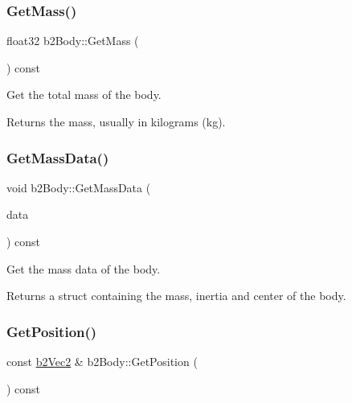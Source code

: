 \subsubsection{\texorpdfstring{Get\+Mass()}{GetMass()}}
{\footnotesize\ttfamily float32 b2\+Body\+::\+Get\+Mass (\begin{DoxyParamCaption}{ }\end{DoxyParamCaption}) const\hspace{0.3cm}{\ttfamily [inline]}}

Get the total mass of the body. \begin{DoxyReturn}{Returns}
the mass, usually in kilograms (kg). 
\end{DoxyReturn}
\mbox{\label{classb2_body_a5100927dbd39dd0addea79d5f323f3f1}} 
\subsubsection{\texorpdfstring{Get\+Mass\+Data()}{GetMassData()}}
{\footnotesize\ttfamily void b2\+Body\+::\+Get\+Mass\+Data (\begin{DoxyParamCaption}\item[{\hyperlink{structb2_mass_data}{b2\+Mass\+Data} $\ast$}]{data }\end{DoxyParamCaption}) const\hspace{0.3cm}{\ttfamily [inline]}}

Get the mass data of the body. \begin{DoxyReturn}{Returns}
a struct containing the mass, inertia and center of the body. 
\end{DoxyReturn}
\mbox{\label{classb2_body_a7944dc953ac0cb1e00b32bc61b50e70d}} 
\subsubsection{\texorpdfstring{Get\+Position()}{GetPosition()}}
{\footnotesize\ttfamily const \hyperlink{structb2_vec2}{b2\+Vec2} \& b2\+Body\+::\+Get\+Position (\begin{DoxyParamCaption}{ }\end{DoxyParamCaption}) const\hspace{0.3cm}{\ttfamily [inline]}}

